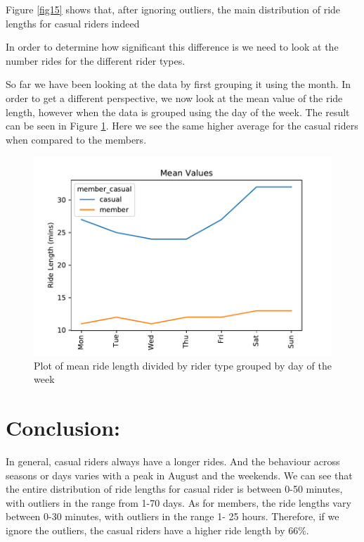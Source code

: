 \documentclass[12pt]{article}
\begin{document}
\begin{itemize}
Figure \ref{fig15} shows that, after ignoring outliers, the main distribution of ride lengths for casual riders indeed   


In order to determine how significant this difference is we need to look at the number rides for the different rider types. 
	
So far we have been looking at the data by first grouping it using the month. In order to get a different perspective, we now look at the mean value of the ride length, however when the data is grouped using the day of the week. The result can be seen in Figure \ref{fig14}. Here we see the same higher average for the casual riders when compared to the members.  

	\begin{figure}[h]
	\centering
	\includegraphics[scale=0.6]{mean_cvsm_dayofweek.pdf} 
	\caption{Plot of mean ride length divided by rider type grouped by day of the week}
	\label{fig14}
	\end{figure}
	
\end{itemize}

\section*{Conclusion:}

In general, casual riders always have a longer rides. And the behaviour across seasons or days varies with a peak in August and the weekends. We can see that the entire distribution of ride lengths for casual rider is between 0-50 minutes, with outliers in the range from 1-70 days. As for members, the ride lengths vary between 0-30 minutes, with outliers in the range 1- 25 hours. Therefore, if we ignore the outliers, the casual riders have a higher ride length by 66\%.
\end{document}
